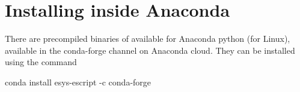 %
%
%


\chapter{Installing inside Anaconda}\label{chap:conda}

There are precompiled binaries of \escript available for Anaconda python (for Linux), available in the conda-forge channel on Anaconda cloud. They can be installed using the command
\begin{shellCode}
conda install esys-escript -c conda-forge
\end{shellCode}

